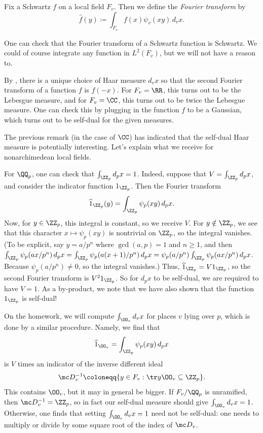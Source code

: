 \documentclass[../notes.tex]{subfiles}
\begin{document}
\begin{notation}
	Fix a Schwartz $f$ on a local field $F_v$. Then we define the \textit{Fourier transform} by
	\[\widehat f(y)\coloneqq\int_{F_v}f(x)\psi_v(xy)\,d_vx.\]
\end{notation}
\begin{remark}
	One can check that the Fourier transform of a Schwartz function is Schwartz. We could of course integrate any function in $L^2(F_v)$, but we will not have a reason to.
\end{remark}
\begin{remark}
	By , there is a unique choice of Haar measure $d_vx$ so that the second Fourier transform of a function $f$ is $f(-x)$. For $F_v=\RR$, this turns out to be the Lebesgue measure, and for $F_v=\CC$, this turns out to be twice the Lebesgue measure. One can check this by plugging in the function $f$ to be a Gaussian, which turns out to be self-dual for the given measures.
\end{remark}
The previous remark (in the case of $\CC$) has indicated that the self-dual Haar measure is potentially interesting. Let's explain what we receive for nonarchimedean local fields.
\begin{example}
	For $\QQ_p$, one can check that $\int_{\ZZ_p}d_px=1$. Indeed, suppose that $V=\int_{\ZZ_p}d_px$, and consider the indicator function $1_{\ZZ_p}$. Then the Fourier transform
	\[\widehat1_{\ZZ_p}(y)=\int_{\ZZ_p}\psi_p(xy)\,d_px.\]
	Now, for $y\in\ZZ_p$, this integral is constant, so we receive $V$. For $y\notin\ZZ_p$, we see that this character $x\mapsto\psi_p(xy)$ is nontrivial on $\ZZ_p$, so the integral vanishes. (To be explicit, say $y=a/p^n$ where $\gcd(a,p)=1$ and $n\ge1$, and then $\int_{\ZZ_p}\psi_p(ax/p^n)\,d_px=\int_{\ZZ_p}\psi_p(a(x+1)/p^n)\,d_px=\psi_p(a/p^n)\int_{\ZZ_p}\psi_p(ax/p^n)\,d_px$. Because $\psi_p(a/p^n)\ne0$, so the integral vanishes.) Thus, $\widehat1_{\ZZ_p}=V1_{\ZZ_p}$, so the second Fourier transform is $V^21_{\ZZ_p}$. So for $d_px$ to be self-dual, we are required to have $V=1$. As a by-product, we note that we have also shown that the function $1_{\ZZ_p}$ is self-dual!
\end{example}
\begin{remark}
	On the homework, we will compute $\int_{\OO_v}d_vx$ for places $v$ lying over $p$, which is done by a similar procedure. Namely, we find that
	\[\widehat1_{\OO_v}=\int_{\ZZ_p}\psi_p(xy)\,d_px\]
	is $V$ times an indicator of the inverse different ideal
	\[\mc D_v^{-1}\coloneqq\{y\in F_v:\tr y\OO_v\subseteq\ZZ_p\}.\]
	This contains $\OO_v$, but it may in general be bigger. If $F_v/\QQ_p$ is unramified, then $\mc D_v^{-1}=\ZZ_p$, so in fact our self-dual measure should give $\int_{\OO_v}d_vx=1$. Otherwise, one finds that setting $\int_{\OO_v}d_vx=1$ need not be self-dual: one needs to multiply or divide by some square root of the index of $\mc D_v$.
\end{remark}
\end{document}
